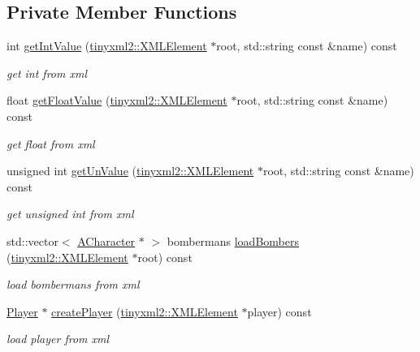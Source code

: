 \subsection*{Private Member Functions}
\begin{DoxyCompactItemize}
\item 
int \hyperlink{class_xml_load_ad95a1e42108dac9b1c89d23f0b9341b3}{get\+Int\+Value} (\hyperlink{classtinyxml2_1_1_x_m_l_element}{tinyxml2\+::\+X\+M\+L\+Element} $\ast$root, std\+::string const \&name) const 
\begin{DoxyCompactList}\small\item\em get int from xml \end{DoxyCompactList}\item 
float \hyperlink{class_xml_load_ab58d4761f6f49ca3ec39569059763b30}{get\+Float\+Value} (\hyperlink{classtinyxml2_1_1_x_m_l_element}{tinyxml2\+::\+X\+M\+L\+Element} $\ast$root, std\+::string const \&name) const 
\begin{DoxyCompactList}\small\item\em get float from xml \end{DoxyCompactList}\item 
unsigned int \hyperlink{class_xml_load_a4210a275d1d8f96ec47c3ad848431546}{get\+Un\+Value} (\hyperlink{classtinyxml2_1_1_x_m_l_element}{tinyxml2\+::\+X\+M\+L\+Element} $\ast$root, std\+::string const \&name) const 
\begin{DoxyCompactList}\small\item\em get unsigned int from xml \end{DoxyCompactList}\item 
std\+::vector$<$ \hyperlink{class_a_character}{A\+Character} $\ast$ $>$ bombermans \hyperlink{class_xml_load_a903aeab03d442461816a3fe816aeea8e}{load\+Bombers} (\hyperlink{classtinyxml2_1_1_x_m_l_element}{tinyxml2\+::\+X\+M\+L\+Element} $\ast$root) const 
\begin{DoxyCompactList}\small\item\em load bombermans from xml \end{DoxyCompactList}\item 
\hyperlink{class_player}{Player} $\ast$ \hyperlink{class_xml_load_abe63285d5007b634763a4a7da8dfa77e}{create\+Player} (\hyperlink{classtinyxml2_1_1_x_m_l_element}{tinyxml2\+::\+X\+M\+L\+Element} $\ast$player) const 
\begin{DoxyCompactList}\small\item\em load player from xml \end{DoxyCompactList}\item 

\end{DoxyCompactItemize}
